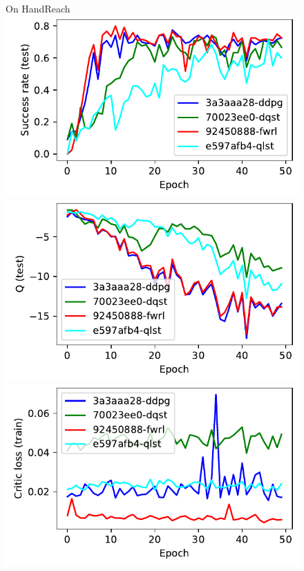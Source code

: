\begin{figure}
  On HandReach\\
  \includegraphics[width=\frac\columnwidth]{media/res/38f4625-92450888-HandReach-v0-fwrl-future/test/success_rate.pdf}%
  \includegraphics[width=\frac\columnwidth]{media/res/38f4625-92450888-HandReach-v0-fwrl-future/test/mean_Q.pdf}%
  \includegraphics[width=\frac\columnwidth]{media/res/38f4625-92450888-HandReach-v0-fwrl-future/train/critic_loss.pdf}%

\end{figure}
